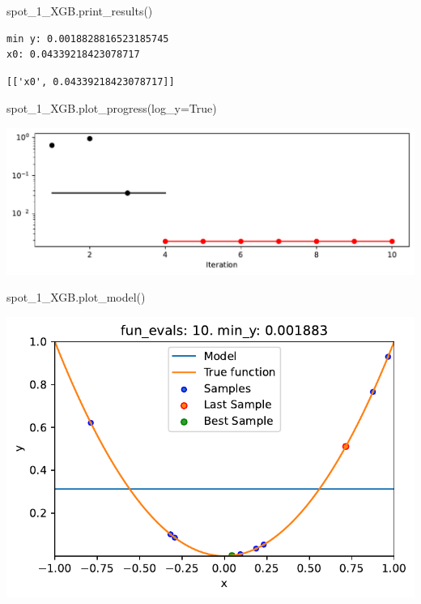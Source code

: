 \documentclass[
  letterpaper,
  DIV=11,
  numbers=noendperiod]{scrreprt}
\newenvironment{Shaded}{\begin{snugshade}}{\end{snugshade}}
\newcommand{\NormalTok}[1]{\textcolor[rgb]{0.00,0.23,0.31}{#1}}
\newcommand{\OperatorTok}[1]{\textcolor[rgb]{0.37,0.37,0.37}{#1}}
\newcommand{\VariableTok}[1]{\textcolor[rgb]{0.07,0.07,0.07}{#1}}
\begin{document}
\begin{Shaded}
\begin{Highlighting}[]
\NormalTok{spot\_1\_XGB.print\_results()}
\end{Highlighting}
\end{Shaded}

\begin{verbatim}
min y: 0.0018828816523185745
x0: 0.04339218423078717
\end{verbatim}

\begin{verbatim}
[['x0', 0.04339218423078717]]
\end{verbatim}

\begin{Shaded}
\begin{Highlighting}[]
\NormalTok{spot\_1\_XGB.plot\_progress(log\_y}\OperatorTok{=}\VariableTok{True}\NormalTok{)}
\end{Highlighting}
\end{Shaded}

\includegraphics{010_num_spot_sklearn_surrogate_files/figure-pdf/cell-45-output-1.pdf}

\begin{Shaded}
\begin{Highlighting}[]
\NormalTok{spot\_1\_XGB.plot\_model()}
\end{Highlighting}
\end{Shaded}

\includegraphics{010_num_spot_sklearn_surrogate_files/figure-pdf/cell-46-output-1.pdf}
\end{document}
